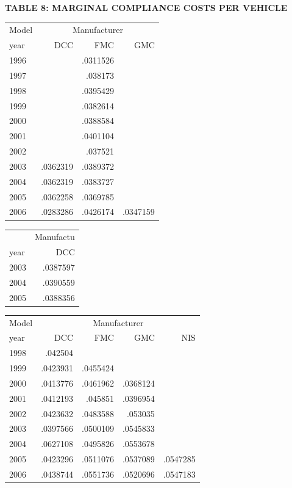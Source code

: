 \vspace{1em}
\noindent\textbf{TABLE 8: MARGINAL COMPLIANCE COSTS PER VEHICLE}
\vspace{0.5em}

\begin{tabular}{lrrr}
\toprule
Model & \multicolumn{3}{c}{Manufacturer} \\
year & DCC & FMC & GMC \\
\midrule
1996 &  & .0311526 &  \\
1997 &  & .038173 &  \\
1998 &  & .0395429 &  \\
1999 &  & .0382614 &  \\
2000 &  & .0388584 &  \\
2001 &  & .0401104 &  \\
2002 &  & .037521 &  \\
2003 & .0362319 & .0389372 &  \\
2004 & .0362319 & .0383727 &  \\
2005 & .0362258 & .0369785 &  \\
2006 & .0283286 & .0426174 & .0347159 \\
\bottomrule
\end{tabular}

\begin{tabular}{lr}
\toprule
 & \multicolumn{1}{c}{Manufactu} \\
year & DCC \\
\midrule
2003 & .0387597 \\
2004 & .0390559 \\
2005 & .0388356 \\
\bottomrule
\end{tabular}

\begin{tabular}{lrrrr}
\toprule
Model & \multicolumn{4}{c}{Manufacturer} \\
year & DCC & FMC & GMC & NIS \\
\midrule
1998 & .042504 &  &  &  \\
1999 & .0423931 & .0455424 &  &  \\
2000 & .0413776 & .0461962 & .0368124 &  \\
2001 & .0412193 & .045851 & .0396954 &  \\
2002 & .0423632 & .0483588 & .053035 &  \\
2003 & .0397566 & .0500109 & .0545833 &  \\
2004 & .0627108 & .0495826 & .0553678 &  \\
2005 & .0423296 & .0511076 & .0537089 & .0547285 \\
2006 & .0438744 & .0551736 & .0520696 & .0547183 \\
\bottomrule
\end{tabular}

